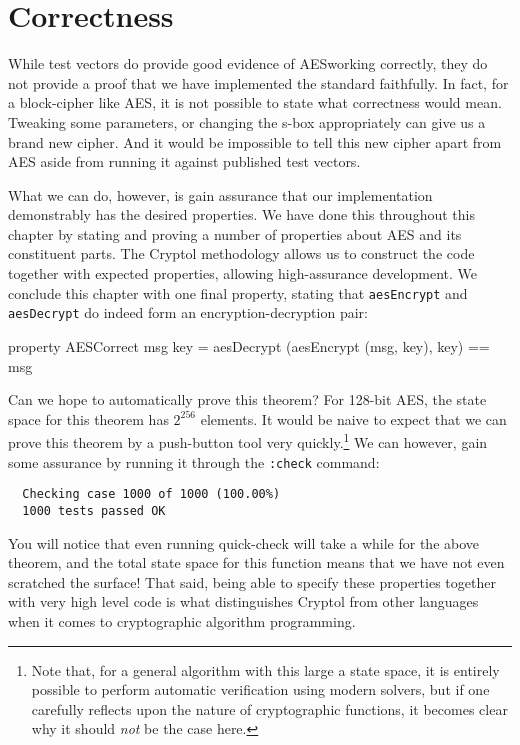 \section{Correctness}
\label{sec:aescorrectattempt}

While test vectors do provide good evidence of AES\indAES working
correctly, they do not provide a proof that we have implemented the
standard faithfully. In fact, for a block-cipher like AES, it is not
possible to state what correctness would mean.  Tweaking some
parameters, or changing the s-box appropriately can give us a brand
new cipher.  And it would be impossible to tell this new cipher apart
from AES aside from running it against published test vectors.


What we can do, however, is gain assurance that our implementation
demonstrably has the desired properties. We have done this throughout
this chapter by stating and proving a number of properties about AES
and its constituent parts. The Cryptol methodology allows us to
construct the code together with expected properties, allowing
high-assurance development. We conclude this chapter with one final
property, stating that {\tt aesEncrypt} and {\tt aesDecrypt} do indeed
form an encryption-decryption pair:

\begin{code}
  property AESCorrect msg key = aesDecrypt (aesEncrypt (msg, key), key) == msg
\end{code}

Can we hope to automatically prove this theorem?  For 128-bit AES, the
state space for this theorem has $2^{256}$ elements.  It would be
naive to expect that we can prove this theorem by a push-button tool
very quickly.\footnote{Note that, for a general algorithm with this
  large a state space, it is entirely possible to perform automatic
  verification using modern solvers, but if one carefully reflects
  upon the nature of cryptographic functions, it becomes clear why it
  should \emph{not} be the case here.}  We can however, gain some
assurance by running it through the {\tt :check} command:\indCmdCheck

\begin{Verbatim}
  Checking case 1000 of 1000 (100.00%) 
  1000 tests passed OK
\end{Verbatim}
You will notice that even running quick-check will take a while for
the above theorem, and the total state space for this function means
that we have not even scratched the surface! That said, being able to
specify these properties together with very high level code is what
distinguishes Cryptol from other languages when it comes to
cryptographic algorithm programming.

